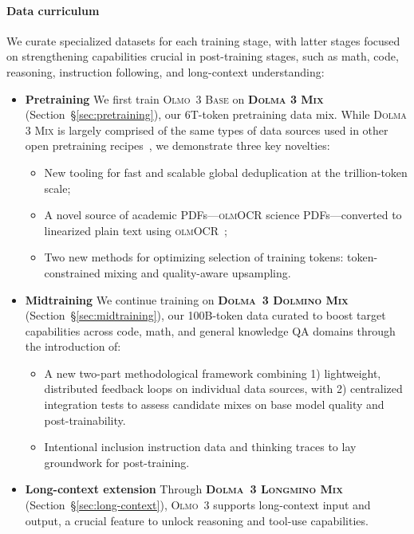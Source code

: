 \documentclass[table]{ai2style/ai2}
\newcommand{\newOlmo}{Olmo\xspace}
\newcommand{\olmothree}{\textsc{\newOlmo~3}\xspace}
\newcommand{\olmothreebase}{\textsc{\newOlmo~3 Base}\xspace}
\newcommand{\dolmatoomix}{\textsc{Dolma 3 Mix}\xspace}
\newcommand{\dolminostoo}{\textsc{Dolma~3 Dolmino Mix}\xspace}
\newcommand{\longminomix}{\textsc{Dolma~3 Longmino Mix}\xspace}
\newcommand{\olmocr}{\textsc{olmOCR}\xspace}
\newcommand{\olmocrPDF}{{\olmocr science PDFs}\xspace}
\begin{document}
\paragraph{Data curriculum}
We curate specialized datasets for each training stage,
with latter stages focused on strengthening capabilities crucial in post-training stages, such as math, code, reasoning, instruction following, and long-context understanding:
\begin{itemize}
\item {\bf{Pretraining}} 
We first train \olmothreebase on {\bf{\dolmatoomix}} (Section~\S\ref{sec:pretraining}), our 6T-token pretraining data mix.
While \dolmatoomix is largely comprised of the same types of data sources used in other open pretraining recipes~\citep{soldaini2024dolma,bakouch2025smollm3,olmo20242olmo2furious}, we demonstrate three key novelties:
\begin{itemize}[itemsep=2pt]
    \item[$\circ$] New tooling for fast and scalable global deduplication at the trillion-token scale;
    \item[$\circ$]  A novel source of academic PDFs---\olmocrPDF---converted to linearized plain text using \olmocr~\citep{poznanski2025olmocr,poznanski2025olmocr2unittest};
    \item[$\circ$]  Two new methods for optimizing selection of training tokens: token-constrained mixing and quality-aware upsampling.
\end{itemize}
\item {\bf{Midtraining}} We continue training on {\bf{\dolminostoo}} (Section~\S\ref{sec:midtraining}), our 100B-token data curated to boost target capabilities across code, math, and general knowledge QA domains through the introduction of: 
\begin{itemize}[itemsep=2pt]
    \item[$\circ$] A new two-part methodological framework combining 1) lightweight, distributed feedback loops on individual data sources, with 2) centralized integration tests to assess candidate mixes on base model quality and post-trainability.
    \item[$\circ$] Intentional inclusion instruction data and thinking traces to lay groundwork for post-training.
\end{itemize}
\item {\bf{Long-context extension}} Through {\bf{\longminomix}} (Section~\S\ref{sec:long-context}), \olmothree  supports long-context input and output, a crucial feature to unlock reasoning and tool-use capabilities.

\end{itemize}
\end{document}
